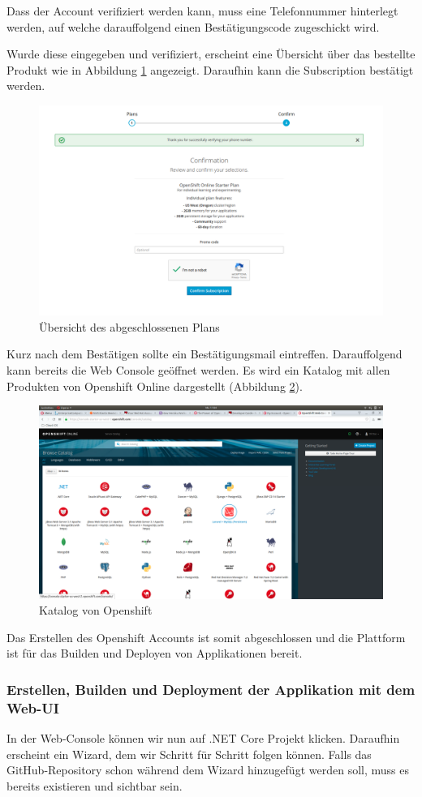 \documentclass[12pt,a4paper]{article}
\begin{document}
Dass der Account verifiziert werden kann, muss eine Telefonnummer hinterlegt werden, auf welche darauffolgend einen Bestätigungscode zugeschickt wird. 

Wurde diese eingegeben und verifiziert, erscheint eine Übersicht über das bestellte Produkt wie in Abbildung \ref{fig:os-overview} angezeigt. Daraufhin kann die Subscription bestätigt werden.

\begin{figure}
	\centering
	\includegraphics[width=0.9\linewidth]{img/os-overview}
	\caption{Übersicht des abgeschlossenen Plans}
	\label{fig:os-overview}
\end{figure}
Kurz nach dem Bestätigen sollte ein Bestätigungsmail eintreffen. Darauffolgend kann bereits die Web Console geöffnet werden. Es wird ein Katalog mit allen Produkten von Openshift Online dargestellt (Abbildung \ref{fig:os-overview-catalog}).

\begin{figure}[h]
	\centering
	\includegraphics[width=0.7\linewidth]{img/os-overview-catalog}
	\caption{Katalog von Openshift}
	\label{fig:os-overview-catalog}
\end{figure}
Das Erstellen des Openshift Accounts ist somit abgeschlossen und die Platt\-form ist für das Builden und Deployen von Applikationen bereit. 
\subsubsection{Erstellen, Builden und Deployment der Applikation mit dem Web-UI}
In der Web-Console können wir nun auf .NET Core Projekt klicken. Daraufhin erscheint ein Wizard, dem wir Schritt für Schritt folgen können. Falls das GitHub-Repository schon während dem Wizard hinzugefügt werden soll, muss es bereits existieren und sichtbar sein. 
\end{document}
